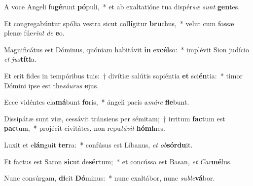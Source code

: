 \item A voce Angeli fu\textbf{gé}runt \textbf{pó}puli,~* et ab exaltatióne tua dispér\textit{sæ} \textit{sunt} \textbf{gen}tes.
\item Et congregabúntur spólia vestra sicut col\textbf{lí}gitur \textbf{bru}chus,~* velut cum fossæ plenæ fúe\textit{rint} \textit{de} \textbf{e}o.
\item Magnificátus est Dóminus, quóniam habitávit \textbf{in} ex\textbf{cél}so:~* implévit Sion judício \textit{et} \textit{jus}\textbf{tí}\textbf{ti}a.
\item Et erit fides in tempóribus tuis:~† divítiæ salútis sapiéntia \textbf{et} sci\textbf{én}tia:~* timor Dómini ipse est the\textit{sáu}\textit{rus} \textbf{e}jus.
\item Ecce vidéntes cla\textbf{má}bunt \textbf{fo}ris,~* ángeli pacis a\textit{má}\textit{re} \textbf{fle}bunt.
\item Dissipátæ sunt viæ, cessávit tránsiens per sémitam;~† irritum \textbf{fac}tum est \textbf{pac}tum,~* projécit civitátes, non repu\textit{tá}\textit{vit} \textbf{hó}\textbf{mi}nes.
\item Luxit et e\textbf{lán}guit \textbf{ter}ra:~* confúsus est Líbanus, \textit{et} \textit{ob}\textbf{sór}\textbf{du}it.
\item Et factus est Saron \textbf{sic}ut de\textbf{sér}tum;~* et concússa est Basan, \textit{et} \textit{Car}\textbf{mé}lus.
\item Nunc consúrgam, \textbf{di}cit \textbf{Dó}minus:~* nunc exaltábor, nunc \textit{sub}\textit{le}\textbf{vá}bor.
